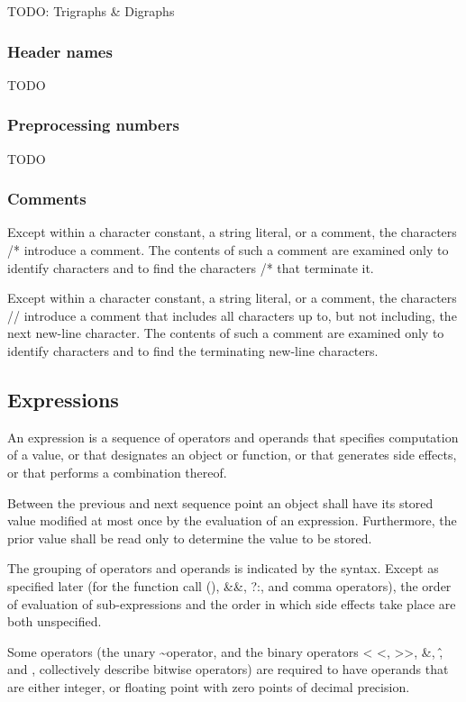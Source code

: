 \documentclass{article}
\begin{document}
TODO: Trigraphs \& Digraphs

\subsubsection{Header names}
TODO
\subsubsection{Preprocessing numbers}
TODO
\subsubsection{Comments}
Except within a character constant, a string literal, or a comment, the characters /* 
introduce a comment.  The contents of such a comment are examined only to identify 
characters and to find the characters /* that terminate it.
\linebreak

Except within a character constant, a string literal, or a comment, the characters // 
introduce a comment that includes all characters up to, but not including, the next 
new-line character.  The contents of such a comment are examined only to identify 
characters and to find the terminating new-line characters.
\linebreak

\subsection{Expressions}
An expression is a sequence of operators and operands that specifies computation of a 
value, or that designates an object or function, or that generates side effects, or that 
performs a combination thereof.
\linebreak

Between the previous and next sequence point an object shall have its stored value 
modified at most once by the evaluation of an expression. Furthermore, the prior value 
shall be read only to determine the value to be stored.
\linebreak

The grouping of operators and operands is indicated by the syntax. Except as specified 
later (for the function call (), \&\&, \textbar\textbar ?:, and comma operators), the 
order of evaluation of sub-expressions and the order in which side effects take place 
are both unspecified.
\linebreak

Some operators (the unary \textasciitilde operator, and the binary operators \textless
\textless, \textgreater\textgreater, \&, \^, and \textbar, collectively describe bitwise 
operators) are required to have operands that are either integer, or floating point with
zero points of decimal precision.
\linebreak
\end{document}
